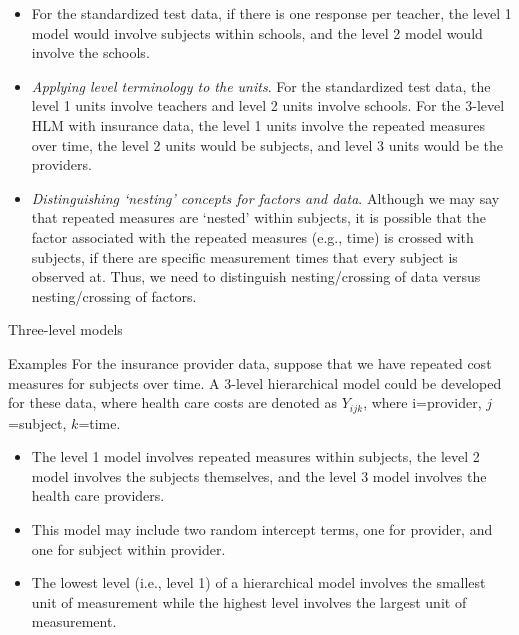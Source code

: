 \documentclass[
  9pt,
  ignorenonframetext,
]{beamer}
\begin{document}
\begin{frame}{}
\protect\hypertarget{section-3}{}
\begin{itemize}
\item
  For the standardized test data, if there is one response per teacher,
  the level 1 model would involve subjects within schools, and the level
  2 model would involve the schools.
\item
  \emph{Applying level terminology to the units}. For the standardized
  test data, the level 1 units involve teachers and level 2 units
  involve schools. For the 3-level HLM with insurance data, the level 1
  units involve the repeated measures over time, the level 2 units would
  be subjects, and level 3 units would be the providers.
\item
  \emph{Distinguishing `nesting' concepts for factors and data}.
  Although we may say that repeated measures are `nested' within
  subjects, it is possible that the factor associated with the repeated
  measures (e.g., time) is crossed with subjects, if there are specific
  measurement times that every subject is observed at. Thus, we need to
  distinguish nesting/crossing of data versus nesting/crossing of
  factors.
\end{itemize}
\end{frame}

\begin{frame}{Three-level models}
\protect\hypertarget{three-level-models}{}
\begin{block}{Examples}
\protect\hypertarget{examples-1}{}
For the insurance provider data, suppose that we have repeated cost
measures for subjects over time. A 3-level hierarchical model could be
developed for these data, where health care costs are denoted as
\(Y_{ijk}\), where i=provider, \(j\)=subject, \(k\)=time.

\begin{itemize}
\item
  The level 1 model involves repeated measures within subjects, the
  level 2 model involves the subjects themselves, and the level 3 model
  involves the health care providers.
\item
  This model may include two random intercept terms, one for provider,
  and one for subject within provider.
\item
  The lowest level (i.e., level 1) of a hierarchical model involves the
  smallest unit of measurement while the highest level involves the
  largest unit of measurement.
\end{itemize}
\end{block}
\end{frame}
\end{document}
